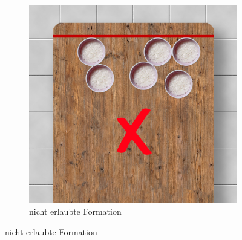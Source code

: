 \documentclass[a5paper, 12pt]{book}
\begin{document}
\begin{enumerate}[(1)]
\begin{figure}[h!]
\begin{subfigure}[b]{0.434\textwidth}
         \includegraphics[width=\textwidth]{no1}
         \caption{nicht erlaubte Formation}
    

\end{subfigure}
\end{figure}
\end{enumerate}
\end{document}
